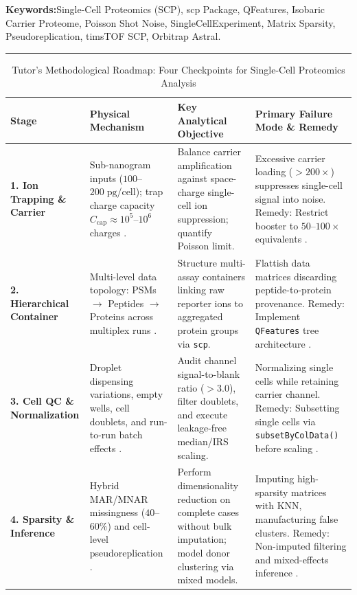 \documentclass[11pt,twoside,openright]{book}
\begin{document}
\noindent
\textbf{Keywords:}\enspace Single-Cell Proteomics (SCP), scp Package, QFeatures, Isobaric Carrier Proteome, Poisson Shot Noise, SingleCellExperiment, Matrix Sparsity, Pseudoreplication, timsTOF SCP, Orbitrap Astral.

\vspace{0.8em}
\noindent\rule{\textwidth}{0.4pt}


\begin{table}[ht]
\centering
\caption{Tutor's Methodological Roadmap: Four Checkpoints for Single-Cell Proteomics Analysis}
\label{tab:scp_roadmap}
\small
\begin{tabularx}{\textwidth}{l p{3.8cm} p{4.2cm} X}
\toprule
\textbf{Stage} & \textbf{Physical Mechanism} & \textbf{Key Analytical Objective} & \textbf{Primary Failure Mode \& Remedy} \\
\midrule
\textbf{1. Ion Trapping \& Carrier} & Sub-nanogram inputs ($100$--$200\;\text{pg}$/cell); trap charge capacity $C_{\text{cap}} \approx 10^5$--$10^6$ charges \cite{slavov2021scope2, cheung2021carrier}. & Balance carrier amplification against space-charge single-cell ion suppression; quantify Poisson limit. & Excessive carrier loading ($>200\times$) suppresses single-cell signal into noise. Remedy: Restrict booster to $50$--$100\times$ equivalents \cite{vanderaa2021scp}. \\
\addlinespace
\textbf{2. Hierarchical Container} & Multi-level data topology: PSMs $\to$ Peptides $\to$ Proteins across multiplex runs \cite{gatto2023qfeatures, vanderaa2023scppackage}. & Structure multi-assay containers linking raw reporter ions to aggregated protein groups via \texttt{scp}. & Flattish data matrices discarding peptide-to-protein provenance. Remedy: Implement \texttt{QFeatures} tree architecture \cite{vanderaa2024using}. \\
\addlinespace
\textbf{3. Cell QC \& Normalization} & Droplet dispensing variations, empty wells, cell doublets, and run-to-run batch effects \cite{woo2022high, gebreyesus2022streamlined}. & Audit channel signal-to-blank ratio ($>3.0$), filter doublets, and execute leakage-free median/IRS scaling. & Normalizing single cells while retaining carrier channel. Remedy: Subsetting single cells via \texttt{subsetByColData()} before scaling \cite{petelski2021multiplexed}. \\
\addlinespace
\textbf{4. Sparsity \& Inference} & Hybrid MAR/MNAR missingness ($40$--$60\%$) and cell-level pseudoreplication \cite{squair2021confronting, zimmerman2021practical, brunner2022ultra}. & Perform dimensionality reduction on complete cases without bulk imputation; model donor clustering via mixed models. & Imputing high-sparsity matrices with KNN, manufacturing false clusters. Remedy: Non-imputed filtering and mixed-effects inference \cite{choi2014msstats}. \\
\bottomrule
\end{tabularx}
\end{table}
\end{document}
